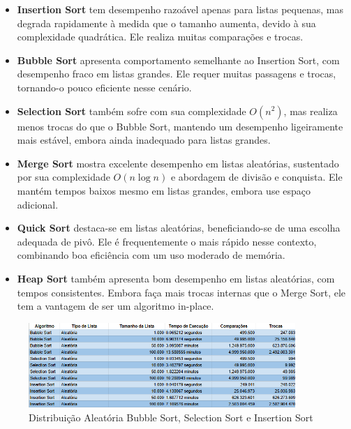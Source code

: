 \documentclass[12pt, a4paper]{report}
\begin{document}
\begin{itemize}
    \item \textbf{Insertion Sort} tem desempenho razoável apenas para listas pequenas, mas degrada rapidamente à medida que o tamanho aumenta, devido à sua complexidade quadrática. Ele realiza muitas comparações e trocas.

    \item \textbf{Bubble Sort} apresenta comportamento semelhante ao Insertion Sort, com desempenho fraco em listas grandes. Ele requer muitas passagens e trocas, tornando-o pouco eficiente nesse cenário.

    \item \textbf{Selection Sort} também sofre com sua complexidade $O(n^2)$, mas realiza menos trocas do que o Bubble Sort, mantendo um desempenho ligeiramente mais estável, embora ainda inadequado para listas grandes.

    \item \textbf{Merge Sort} mostra excelente desempenho em listas aleatórias, sustentado por sua complexidade $O(n \log n)$ e abordagem de divisão e conquista. Ele mantém tempos baixos mesmo em listas grandes, embora use espaço adicional.

    \item \textbf{Quick Sort} destaca-se em listas aleatórias, beneficiando-se de uma escolha adequada de pivô. Ele é frequentemente o mais rápido nesse contexto, combinando boa eficiência com um uso moderado de memória.

    \item \textbf{Heap Sort} também apresenta bom desempenho em listas aleatórias, com tempos consistentes. Embora faça mais trocas internas que o Merge Sort, ele tem a vantagem de ser um algoritmo in-place.

\end{itemize}


\begin{figure}[H]
    \centering
    \includegraphics[width=0.9\textwidth]{listas/aleatorio4.png}
    \caption{Distribuição Aleatória Bubble Sort, Selection Sort e Insertion Sort}
    \label{fig:aleatorio4}
\end{figure}
\end{document}
